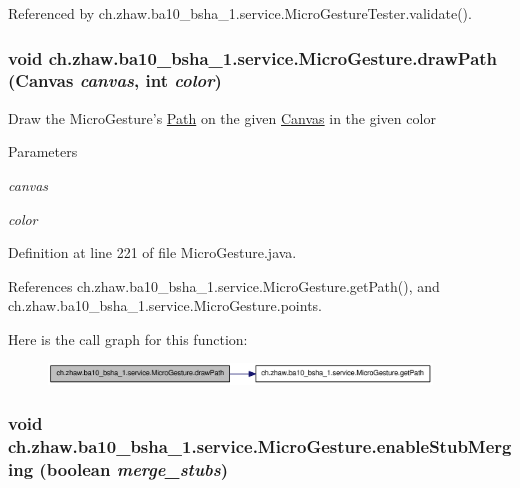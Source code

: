 Referenced by ch.zhaw.ba10\_\-bsha\_\-1.service.MicroGestureTester.validate().\hypertarget{classch_1_1zhaw_1_1ba10__bsha__1_1_1service_1_1MicroGesture_aa06eca44734c4df4bc13c1d045724904}{
\subsubsection[{drawPath}]{\setlength{\rightskip}{0pt plus 5cm}void ch.zhaw.ba10\_\-bsha\_\-1.service.MicroGesture.drawPath (Canvas {\em canvas}, \/  int {\em color})}}
\label{classch_1_1zhaw_1_1ba10__bsha__1_1_1service_1_1MicroGesture_aa06eca44734c4df4bc13c1d045724904}
Draw the MicroGesture's \hyperlink{}{Path} on the given \hyperlink{}{Canvas} in the given color


\begin{DoxyParams}{Parameters}
\item[{\em canvas}]\item[{\em color}]\end{DoxyParams}


Definition at line 221 of file MicroGesture.java.

References ch.zhaw.ba10\_\-bsha\_\-1.service.MicroGesture.getPath(), and ch.zhaw.ba10\_\-bsha\_\-1.service.MicroGesture.points.

Here is the call graph for this function:\nopagebreak
\begin{figure}[H]
\begin{center}
\leavevmode
\includegraphics[width=289pt]{classch_1_1zhaw_1_1ba10__bsha__1_1_1service_1_1MicroGesture_aa06eca44734c4df4bc13c1d045724904_cgraph}
\end{center}
\end{figure}
\hypertarget{classch_1_1zhaw_1_1ba10__bsha__1_1_1service_1_1MicroGesture_ad5c219a463ce524eb0778e71717e7938}{
\subsubsection[{enableStubMerging}]{\setlength{\rightskip}{0pt plus 5cm}void ch.zhaw.ba10\_\-bsha\_\-1.service.MicroGesture.enableStubMerging (boolean {\em merge\_\-stubs})}}
\label{classch_1_1zhaw_1_1ba10__bsha__1_1_1service_1_1MicroGesture_ad5c219a463ce524eb0778e71717e7938}


